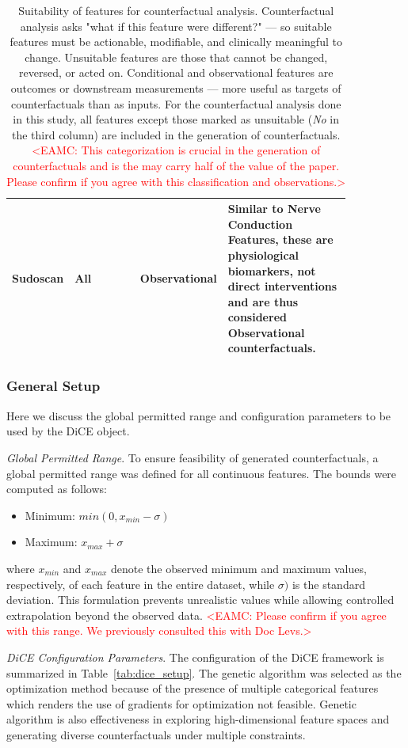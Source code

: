 \documentclass[fleqn,10pt]{wlscirep}
\begin{document}
\begin{table}[h!]
\begin{tabular}{p{0.1\linewidth} p{0.25\linewidth} p{0.1\linewidth} p{0.4\linewidth}}
\midrule
Sudoscan & All & Observational &  Similar to Nerve Conduction Features, these are physiological biomarkers, not direct interventions and are thus considered Observational counterfactuals. \\
\bottomrule
\end{tabular}
\caption{Suitability of features for counterfactual analysis. Counterfactual analysis asks "what if this feature were different?" — so suitable features must be actionable, modifiable, and clinically meaningful to change. Unsuitable features are those that cannot be changed, reversed, or acted on. Conditional and observational features are outcomes or downstream measurements — more useful as targets of counterfactuals than as inputs. For the counterfactual analysis done in this study, all features except those marked as unsuitable (\textit{No} in the third column) are included in the generation of counterfactuals.
\textcolor{red}{<EAMC: This categorization is crucial in the generation of counterfactuals and is the may carry half of the value of the paper.  Please confirm if you agree with this classification and observations.>}
}
\label{tab:cf_features}
\end{table}

\subsubsection*{General Setup}
Here we discuss the global permitted range and configuration parameters to be used by the DiCE object.

\textit{Global Permitted Range}.
To ensure feasibility of generated counterfactuals, a global permitted range was defined for all continuous features. The bounds were computed as follows:
\begin{itemize}
    \itemsep0em 
    \item Minimum: $min(0,x_{min} - \sigma)$
    \item Maximum: $x_{max} + \sigma$
\end{itemize}
where $x_{min}$ and $x_{max}$ denote the observed minimum and maximum values, respectively, of each feature in the entire dataset, while $\sigma)$ is the standard deviation. This formulation prevents unrealistic values while allowing controlled extrapolation beyond the observed data.
\textcolor{red}{<EAMC: Please confirm if you agree with this range. We previously consulted this with Doc Levs.>}

\textit{DiCE Configuration Parameters}. The configuration of the DiCE framework is summarized in Table~\ref{tab:dice_setup}. The genetic algorithm was selected as the optimization method because of the presence of multiple categorical features which renders the use of gradients for optimization not feasible. Genetic algorithm is also effectiveness in exploring high-dimensional feature spaces and generating diverse counterfactuals under multiple constraints.
\end{document}
